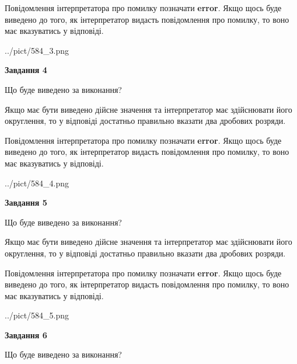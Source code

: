 \documentclass[12pt, ukrainian]{article}
\begin{document}
{\begin {Large}
Повідомлення інтерпретатора про помилку позначати \textbf{error}.
Якщо щось буде виведено до того, як інтерпретатор видасть повідомлення про помилку, 
то воно має вказуватись у відповіді. \par

\begin{center}
	{../pict/584_3.png}
\end{center}
\newpage

{\begin {center}\textbf{Завдання 4}\end {center}}\par
Що буде виведено за виконання? \par

Якщо має бути виведено дійсне значення та інтерпретатор має здійснювати його округлення, 
то у відповіді достатньо правильно вказати два дробових розряди.

Повідомлення інтерпретатора про помилку позначати \textbf{error}.
Якщо щось буде виведено до того, як інтерпретатор видасть повідомлення про помилку, 
то воно має вказуватись у відповіді. \par

\begin{center}
	{../pict/584_4.png}
\end{center}
\newpage

{\begin {center}\textbf{Завдання 5}\end {center}}\par
Що буде виведено за виконання? \par

Якщо має бути виведено дійсне значення та інтерпретатор має здійснювати його округлення, 
то у відповіді достатньо правильно вказати два дробових розряди.

Повідомлення інтерпретатора про помилку позначати \textbf{error}.
Якщо щось буде виведено до того, як інтерпретатор видасть повідомлення про помилку, 
то воно має вказуватись у відповіді. \par

\begin{center}
	{../pict/584_5.png}
\end{center}
\newpage

{\begin {center}\textbf{Завдання 6}\end {center}}\par
Що буде виведено за виконання? \par


\end{Large}}
\end{document}
